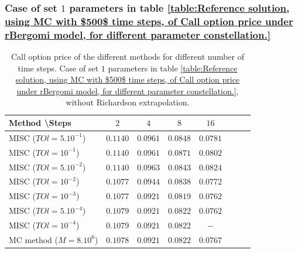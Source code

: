 \documentclass[11pt]{article}
\begin{document}
%


\FloatBarrier
\subsubsection{Case of set $1$ parameters in table \ref{table:Reference solution, using MC with $500$ time steps, of Call option price under rBergomi model, for different parameter constellation.}}\label{sec:Case of set 1 parameters}


\begin{table}[h!]
	\centering
	\begin{tabular}{l*{6}{c}r}
		Method \textbackslash  Steps            & $2$ & $4$ & $8$ & $16$ &   \\
		\hline
		MISC ($TOl=5.10^{-1}$)  & $0.1140$ & $0.0961$ & $0.0848$ & $0.0781$  \\
		MISC ($TOl=10^{-1}$)  & $0.1140$ & $0.0961$ & $0.0871$ & $0.0802$  \\
		MISC ($TOl=5.10^{-2}$)  & $0.1140$ & $0.0963$ & $0.0843$ & $0.0824$  \\
		MISC ($TOl=10^{-2}$)  & $0.1077$ & $0.0944$ & $0.0838$ & $0.0772$  \\
		MISC ($TOl=10^{-3}$)  & $0.1077$ & $0.0921$ & $0.0819$ & $0.0762$  \\
			MISC ($TOl=5.10^{-4}$)  & $0.1079   $ & $0.0921$ & $0.0822$ & $0.0762$  \\
		MISC ($TOl=10^{-4}$)  & $0.1079$ & $0.0921$ & $0.0822$ & $-$  \\
		\hline
		MC method ($M=8.10^{6}$)   & $  0.1078$ & $ 0.0921
		$  & $   0.0822
		$ & $ 0.0767$ \\		
		
		\hline
	\end{tabular}
	\caption{ Call option price of the different methods for different number of time steps. Case of set $1$ parameters in table \ref{table:Reference solution, using MC with $500$ time steps, of Call option price under rBergomi model, for different parameter constellation.}, without Richardson extrapolation.}
	\label{table: Call option price of the different methods for different number of time steps. Case set 1}
\end{table}
\end{document}
